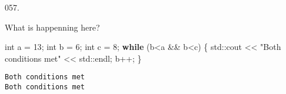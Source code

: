 \documentclass[]{book}
\newenvironment{Shaded}{}{}
\newcommand{\BuiltInTok}[1]{#1}
\newcommand{\ControlFlowTok}[1]{\textcolor[rgb]{0.00,0.44,0.13}{\textbf{#1}}}
\newcommand{\DataTypeTok}[1]{\textcolor[rgb]{0.56,0.13,0.00}{#1}}
\newcommand{\DecValTok}[1]{\textcolor[rgb]{0.25,0.63,0.44}{#1}}
\newcommand{\NormalTok}[1]{#1}
\newcommand{\StringTok}[1]{\textcolor[rgb]{0.25,0.44,0.63}{#1}}
\begin{document}
\begin{minipage}{\linewidth}\noindent
{\tiny 057.}\\
\begin{minipage}[t]{.485\linewidth}

What is happenning here?

\begin{framed}

\begin{Shaded}
\begin{Highlighting}[]
\DataTypeTok{int}\NormalTok{ a = }\DecValTok{13}\NormalTok{;}
\DataTypeTok{int}\NormalTok{ b = }\DecValTok{6}\NormalTok{;}
\DataTypeTok{int}\NormalTok{ c = }\DecValTok{8}\NormalTok{;}
\ControlFlowTok{while}\NormalTok{ (b<a && b<c) \{}
  \BuiltInTok{std::}\NormalTok{cout << }\StringTok{"Both conditions met"}
\NormalTok{            << }\BuiltInTok{std::}\NormalTok{endl;}
\NormalTok{  b++;}
\NormalTok{\}}
\end{Highlighting}
\end{Shaded}

\end{framed}

\end{minipage}
\hfill
\begin{minipage}[t]{.485\linewidth}

\begin{framed}

\begin{verbatim}
Both conditions met
Both conditions met
\end{verbatim}

\end{framed}

\end{minipage}
\end{minipage}

\vspace{2mm}\noindent\hrulefill{}
\end{document}
